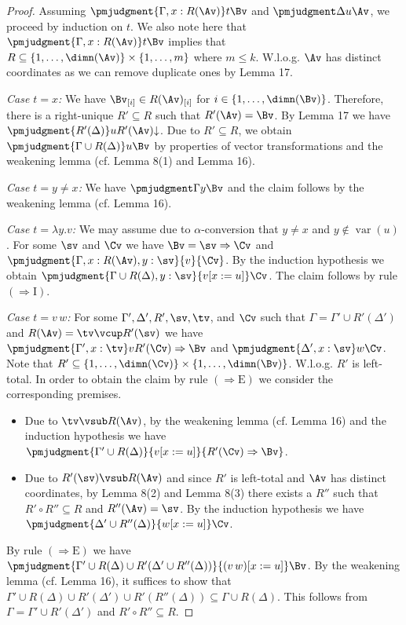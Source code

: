 \begin{proof}
Assuming $\pmjudgment{\Gamma,x:R(\Av)}t\Bv$ and $\pmjudgment\Delta u\Av$, we proceed by induction on $t$. We also note here that $\pmjudgment{\Gamma,x:R(\Av)}t\Bv$ implies that $R\subseteq\{1,\ldots,\dimn(\Av)\}\times\{1,\ldots,m\}$ where $m\leq k$. W.l.o.g. $\Av$ has distinct coordinates as we can remove duplicate ones by Lemma 17.\par
\emph{Case $t=x$:} We have $\Bv_{[i]}\in R(\Av)_{[i]}$ for $i\in\{1,\ldots,\dimn(\Bv)\}$. Therefore, there is a right-unique $R'\subseteq R$ such that $R'(\Av)=\Bv$. By Lemma 17 we have $\pmjudgment{R'(\Delta)}u{R'(\Av)\mathord\downarrow}$. Due to $R'\subseteq R$, we obtain $\pmjudgment{\Gamma\cup R(\Delta)}u\Bv$ by properties of vector transformations and the weakening lemma (cf. Lemma 8(1) and Lemma 16).\par
\emph{Case $t=y\neq x$:} We have $\pmjudgment\Gamma y\Bv$ and the claim follows by the weakening lemma (cf. Lemma 16).\par
\emph{Case $t=\lambda y.v$:} We may assume due to $\alpha$-conversion that $y\neq x$ and $y\notin\operatorname{var}(u)$. For some $\sv$ and $\Cv$ we have $\Bv=\sv\Rightarrow\Cv$ and $\pmjudgment{\Gamma,x:R(\Av),y:\sv}{v}{\Cv}$. By the induction hypothesis we obtain $\pmjudgment{\Gamma\cup R(\Delta),y:\sv}{v[x:=u]}\Cv$. The claim follows by rule $(\Rightarrow\mathrm I)$.\par
\emph{Case $t=v\,w$:} For some $\Gamma',\Delta',R',\sv,\tv$, and $\Cv$ such that $\Gamma=\Gamma'\cup R'(\Delta')$ and $R(\Av)=\tv\vcup R'(\sv)$ we have $\pmjudgment{\Gamma',x:\tv}v{R'(\Cv)\Rightarrow\Bv}$ and $\pmjudgment{\Delta',x:\sv}w\Cv$.
Note that $R'\subseteq\{1,\ldots,\dimn(\Cv)\}\times\{1,\ldots,\dimn(\Bv)\}$. W.l.o.g. $R'$ is left-total. In order to obtain the claim by rule $(\Rightarrow\mathrm E)$ we consider the corresponding premises.
\begin{itemize}
\item Due to $\tv\vsub R(\Av)$, by the weakening lemma (cf. Lemma 16) and the induction hypothesis we have $\pmjudgment{\Gamma'\cup R(\Delta)}{v[x:=u]}{R'(\Cv)\Rightarrow\Bv}$.
\item Due to $R'(\sv)\vsub R(\Av)$ and since $R'$ is left-total and $\Av$ has distinct coordinates, by Lemma 8(2) and Lemma 8(3) there exists a $R''$ such that $R'\circ R''\subseteq R$ and $R''(\Av)=\sv$. By the induction hypothesis we have $\pmjudgment{\Delta'\cup R''(\Delta)}{w[x:=u]}\Cv$.
\end{itemize}
By rule $(\Rightarrow\mathrm E)$ we have $\pmjudgment{\Gamma'\cup R(\Delta)\cup R'(\Delta'\cup R''(\Delta))}{(v\,w)[x:=u]}\Bv$. By the weakening lemma (cf. Lemma 16), it suffices to show that $\Gamma'\cup R(\Delta)\cup R'(\Delta')\cup R'(R''(\Delta))\subseteq\Gamma\cup R(\Delta)$. This follows from $\Gamma=\Gamma'\cup R'(\Delta')$ and $R'\circ R''\subseteq R$.
\end{proof}
